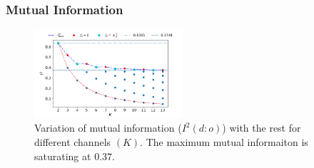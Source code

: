 \documentclass[reprint,prb,superscriptaddress]{revtex4-2}
\begin{document}
\subsubsection{Mutual Information}

\begin{figure}[!htpb]
\includegraphics[width=0.49\textwidth]{plt/NEW31Dec_I_2_vs_Nch_[0,1]}
\caption{Variation of mutual information ($I^2(d:o)$) with the rest for different channels $(K)$. The maximum mutual informaiton is saturating at $0.37$.}
\label{fig:MI_d_o}
\end{figure}
\end{document}
